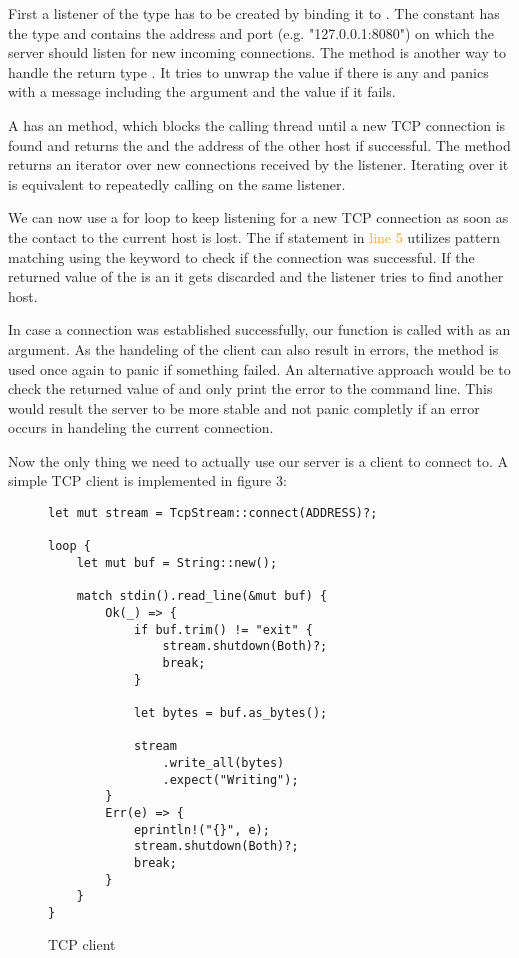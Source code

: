 First a listener of the type  has to be created by binding it to . The
constant  has the type  and contains the address and port (e.g. "127.0.0.1:8080") on which the
server should listen for new incoming connections. The method  is another way to handle the return type
. It tries to unwrap the  value if there is any and panics with a message including the argument
and the  value if it fails.

A  has an  method, which blocks the calling thread until a new TCP connection is found
and returns the  and the address of the other host if successful. The method  returns an
iterator over new connections received by the listener. Iterating over it is equivalent to repeatedly calling
 on the same listener.

We can now use a for loop to keep listening for a new TCP connection as soon as the contact to the current host is
lost. The if statement in \textcolor{orange}{line 5} utilizes pattern matching using the keyword  to check
if the connection was successful. If the returned value of the  is an  it gets discarded
and the listener tries to find another host.

In case a connection was established successfully, our function  is called with  as an
argument. As the handeling of the client can also result in errors, the  method is used once again to
panic if something failed. An alternative approach would be to check the returned value of  and
only print the error to the command line. This would result the server to be more stable and not panic completly if an
error occurs in handeling the current connection.

Now the only thing we need to actually use our server is a client to connect to. A simple TCP client is implemented in
figure 3:

\begin{figure}[ht]
    \begin{verbatim}
let mut stream = TcpStream::connect(ADDRESS)?;

loop {
    let mut buf = String::new();

    match stdin().read_line(&mut buf) {
        Ok(_) => {
            if buf.trim() != "exit" {
                stream.shutdown(Both)?;
                break;
            }

            let bytes = buf.as_bytes();

            stream
                .write_all(bytes)
                .expect("Writing");
        }
        Err(e) => {
            eprintln!("{}", e);
            stream.shutdown(Both)?;
            break;
        }
    }
}
    \end{verbatim}
    \caption{TCP client}
\end{figure}

